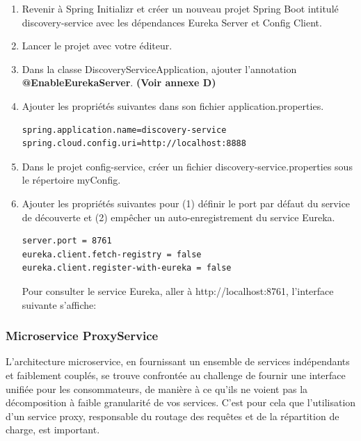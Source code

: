     
    \begin{enumerate}
\item Revenir à Spring Initializr et créer un nouveau projet Spring Boot intitulé discovery-service avec les dépendances Eureka Server et Config Client.
\item Lancer le projet avec votre éditeur.
\item Dans la classe DiscoveryServiceApplication, ajouter l'annotation \textbf{@EnableEurekaServer}. \textbf{(Voir annexe D)} 

\item  Ajouter les propriétés suivantes dans son fichier application.properties.

\begin{lstlisting}
spring.application.name=discovery-service
spring.cloud.config.uri=http://localhost:8888
\end{lstlisting}

\item Dans le projet config-service, créer un fichier discovery-service.properties sous le répertoire myConfig.

\item Ajouter les propriétés suivantes pour (1) définir le port par défaut du service de découverte et (2) empêcher un auto-enregistrement du service Eureka.

\begin{lstlisting}
server.port = 8761
eureka.client.fetch-registry = false
eureka.client.register-with-eureka = false
\end{lstlisting}

Pour consulter le service Eureka, aller à {\color{red}  http://localhost:8761}, l'interface suivante s'affiche:



    \end{enumerate}
    
    
    \subsubsection{Microservice ProxyService}
    L'architecture microservice, en fournissant un ensemble de services indépendants et faiblement couplés, se trouve confrontée au challenge de fournir une interface unifiée pour les consommateurs, de manière à ce qu'ils ne voient pas la décomposition à faible granularité de vos services. C'est pour cela que l'utilisation d'un service proxy, responsable du routage des requêtes et de la répartition de charge, est important.
    

